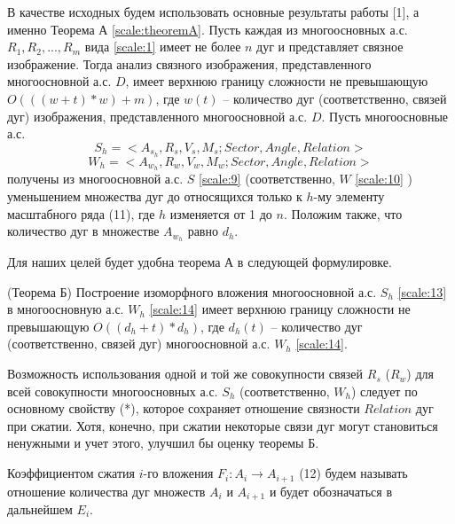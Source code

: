 В качестве исходных будем использовать основные результаты   работы  [1], а именно  
Теорема А \ref{scale:theoremA}.  Пусть каждая из многоосновных а.с. $R_1, R_2,..., R_m$  вида \ref{scale:1}  имеет не  более   $n$ дуг и представляет связное изображение. Тогда анализ  связного изображения, представленного  многоосновной а.с.  $D$,  имеет верхнюю границу сложности не превышающую $O(((w + t)*w) + m)$,  где  $w (t)$ – количество дуг (соответственно, связей дуг) изображения, представленного  многоосновной а.с. $D$.  
Пусть  многоосновные  а.с.  
\begin{equation}
S_h =< A_{s_h}, R_s, V_s, M_s; Sector, Angle, Relation>
\label{scale:13}
\end{equation}
\begin{equation}
W_h = < A_{w_h}, R_w, V_w, M_w; Sector,  Angle, Relation>
\label{scale:14}
\end{equation}
получены из многоосновной  а.с. $S$ \ref{scale:9} (соответственно,  $W$ \ref{scale:10} ) уменьшением множества дуг до  относящихся только к $h$-му элементу   масштабного ряда (11),  где  $h$  изменяется  от 1  до  $n$.  Положим также, что количество дуг в множестве  $A_{w_h}$ равно $d_h$.

\noindent
Для наших целей будет удобна  теорема  А в следующей формулировке.	
\begin{theorem}
(Теорема Б) Построение изоморфного  вложения  многоосновной  а.с. $S_h$ \ref{scale:13} в многоосновную  а.с. $W_h$  \ref{scale:14} имеет верхнюю границу сложности не превышающую $O((d_h + t)* d_h)$,  где  $d_h(t)$ – количество дуг (соответственно, связей дуг) многоосновной  а.с. $W_h$ \ref{scale:14}.
\label{scale:theoremB}
\end{theorem}

\begin{remark}
Возможность использования  одной и той же совокупности связей $R_s$ ($R_w$) для всей совокупности  многоосновных  а.с. $S_h$ (соответственно, $W_h$) следует по основному свойству (*),  которое сохраняет  отношение связности $Relation$ дуг при сжатии.  Хотя, конечно, при сжатии некоторые связи дуг могут становиться ненужными и учет этого, улучшил бы  оценку теоремы  Б.   
\end{remark}

\begin{definition}
Коэффициентом сжатия $i$-го  вложения $F_i : A_i \to A_{i+1}$ (12) будем называть отношение количества дуг множеств $A_i$ и $A_{i+1}$ и будет обозначаться в дальнейшем $E_i$.  
\end{definition}

